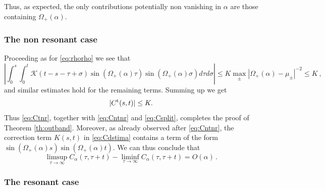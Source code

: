 \documentclass[11pt]{article}
\numberwithin{equation}{section}
\numberwithin{theorem}{section}
\begin{document}
Thus, as expected, the only contributions
potentially non vanishing in $\alpha$ are those containing $\Omega_+(\alpha)$.


\subsubsection{The non resonant case}\label{subsec:Ctnr}
Proceeding as for \eqref{eq:rhorho} we see that
\[
\left|\int_0^s\int_0^t \mathcal K(t-s-\tau+\sigma)\sin(\Omega_+(\alpha)\tau)\sin(\Omega_+(\alpha)\sigma)d\tau
d\sigma\right|\leq K\max_\pm|\Omega_+(\alpha)-\mu_\pm|^{-2}\leq K\ ,
\]
and similar estimates hold for the remaining terms. Summing up we get
\begin{equation}\label{eq:Ctnr}
|C^{\rm t}(s,t)|\leq K.
\end{equation}
Thus \eqref{eq:Ctnr}, together with \eqref{eq:Cntnr} and \eqref{eq:Csplit}, completes the proof of Theorem
\ref{th:outband}. Moreover, as already observed after \eqref{eq:Cntnr}, the
correction term $K(s,t)$ in \eqref{eq:Cdstima} contains a term of the form $\sin(\Omega_+(\alpha)s)\sin(\Omega_+(\alpha)t)$.
We can thus conclude that
\begin{equation}\label{eq:infsupnr}
\limsup_{\tau\to\infty}C_\alpha(\tau,\tau+t)- \liminf_{\tau\to\infty}C_\alpha(\tau,\tau+t)=O(\alpha)\, .
\end{equation}

\subsubsection{The resonant case}
\end{document}
